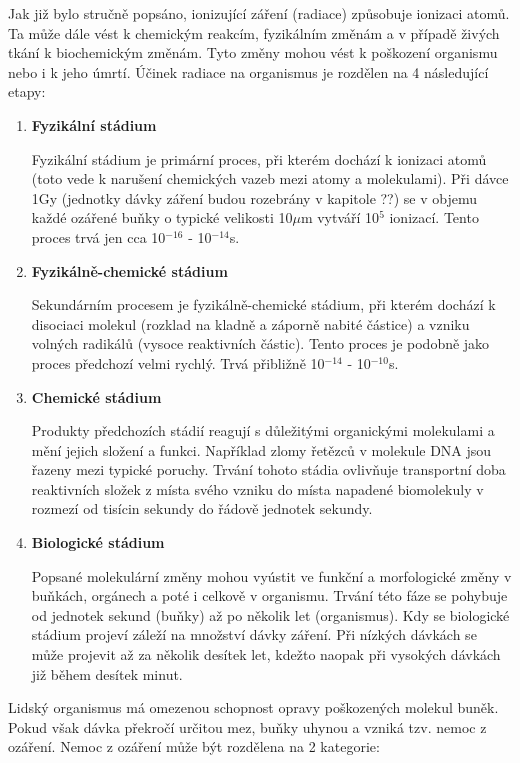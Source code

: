 Jak již bylo stručně popsáno, ionizující záření (radiace) způsobuje ionizaci atomů. Ta může dále vést k chemickým reakcím, fyzikálním změnám a v případě živých tkání k biochemickým změnám. Tyto změny mohou vést k poškození organismu nebo i k jeho úmrtí. Účinek radiace na organismus je rozdělen na 4 následující etapy: %

\begin{enumerate}
	\item \textbf{Fyzikální stádium}
	
		Fyzikální stádium je primární proces, při kterém dochází k ionizaci atomů (toto vede k narušení chemických vazeb mezi atomy a molekulami). Při dávce 1Gy (jednotky dávky záření budou rozebrány v kapitole ??) se v objemu každé ozářené buňky o typické velikosti 10$\mu$m vytváří 10$^5$ ionizací. Tento proces trvá jen cca 10$^{-16}$ - 10$^{-14}$s.
		
	\item \textbf{Fyzikálně-chemické stádium}
	
	Sekundárním procesem je fyzikálně-chemické stádium, při kterém dochází k disociaci molekul (rozklad na kladně a záporně nabité částice) a vzniku volných radikálů (vysoce reaktivních částic). Tento proces je podobně jako proces předchozí velmi rychlý. Trvá přibližně 10$^{-14}$ - 10$^{-10}$s.	 
	
	\item \textbf{Chemické stádium}
	
	Produkty předchozích stádií reagují s důležitými organickými molekulami a mění jejich složení a funkci. Například zlomy řetězců v molekule DNA jsou řazeny mezi typické poruchy. Trvání tohoto stádia ovlivňuje transportní doba reaktivních složek z místa svého vzniku do místa napadené biomolekuly v rozmezí od tisícin sekundy do řádově jednotek sekundy.
	
	\item \textbf{Biologické stádium}
	
	Popsané molekulární změny mohou vyústit ve funkční a morfologické změny v buňkách, orgánech a poté i celkově v organismu. Trvání této fáze se pohybuje od jednotek sekund (buňky) až po několik let (organismus). Kdy se biologické stádium projeví záleží na množství dávky záření. Při nízkých dávkách se může projevit až za několik desítek let, kdežto naopak při vysokých dávkách již během desítek minut. 
\end{enumerate}

Lidský organismus má omezenou schopnost opravy poškozených molekul buněk. Pokud však dávka překročí určitou mez, buňky uhynou a vzniká tzv. nemoc z ozáření. 	%
Nemoc z ozáření může být rozdělena na 2 kategorie: %

